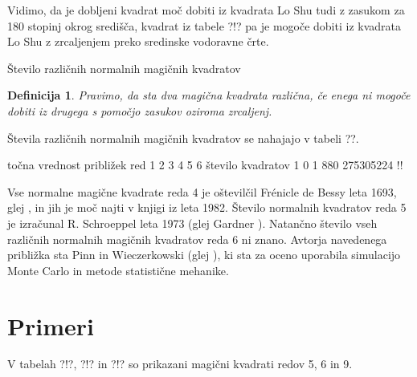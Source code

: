 \documentclass[a4paper,12pt]{article}
\newtheorem{definicija}[izrek]{Definicija}
\begin{document}
Vidimo, da je dobljeni kvadrat moč dobiti iz kvadrata Lo Shu tudi z zasukom za
180 stopinj okrog središča, kvadrat iz tabele ?!? pa je mogoče dobiti
iz kvadrata Lo Shu z zrcaljenjem preko sredinske vodoravne črte.

Število različnih normalnih magičnih kvadratov

\begin{definicija}
      Pravimo, da sta dva magična kvadrata \emph{različna}, če enega ni mogoče dobiti
      iz drugega s pomočjo zasukov oziroma zrcaljenj.
\end{definicija}

Števila različnih normalnih magičnih kvadratov se nahajajo v tabeli ??.

      točna vrednost približek
      red 1 2 3 4 5 6
      število kvadratov 1 0 1 880 275305224 !!

Vse normalne magične kvadrate reda 4 je oštevilčil Frénicle de Bessy
leta 1693, glej \cite{bessy}, in jih je moč najti v knjigi \cite{berlekamp}
iz leta 1982. Število normalnih kvadratov reda 5 je izračunal
R. Schroeppel leta 1973 (glej Gardner \cite{gardner}).
Natančno število vseh različnih normalnih magičnih kvadratov reda 6 ni znano.
Avtorja navedenega približka sta Pinn in Wieczerkowski (glej \cite{pinn}), ki
sta za oceno uporabila simulacijo Monte Carlo in metode statistične mehanike.


\section{Primeri}

V tabelah ?!?, ?!? in ?!? so prikazani
magični kvadrati redov 5, 6 in 9.


\end{document}
